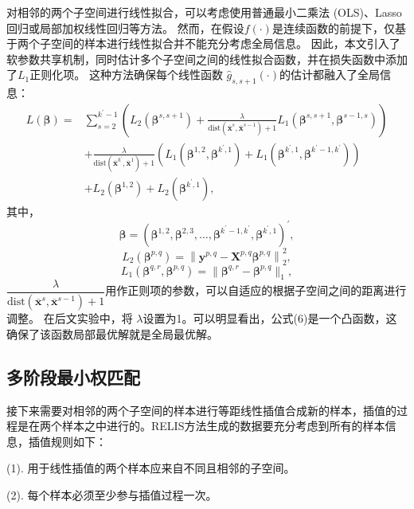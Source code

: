 \documentclass[12pt,a4paper]{article}%
\begin{document}
	对相邻的两个子空间进行线性拟合，可以考虑使用普通最小二乘法 (OLS)、Lasso 回归或局部加权线性回归等方法\cite{bib19,bib20,bib21}。 然而，在假设$f(\cdot) $是连续函数的前提下，仅基于两个子空间的样本进行线性拟合并不能充分考虑全局信息。
	因此，本文引入了软参数共享机制\cite{bib22,bib23,bib24}，同时估计多个子空间之间的线性拟合函数，并在损失函数中添加了$L_1$正则化项。 这种方法确保每个线性函数 $\hat{g}_{s,s+1}(\cdot)$的估计都融入了全局信息：
	\begin{equation} \label{equ8}
		\begin{aligned}
			L(\boldsymbol{\beta}) = & \sum\limits_{s=2}^{k^\prime-1}\left(L_2(\boldsymbol{\beta}^{s,s+1}) + \frac{\lambda}{\text{dist}(\overline{\boldsymbol{x}}^{s}, \overline{\boldsymbol{x}}^{s-1}) + 1}L_1(\boldsymbol{\beta}^{s,s+1}, \boldsymbol{\beta}^{s-1,s}) \right) \\
			&+ \frac{\lambda}{\text{dist}(\overline{\boldsymbol{x}}^{k^\prime}, \overline{\boldsymbol{x}}^{1}) + 1}(L_1(\boldsymbol{\beta}^{1,2}, \boldsymbol{\beta}^{k^\prime,1})+L_1(\boldsymbol{\beta}^{k^\prime,1},
			\boldsymbol{\beta}^{k^\prime-1,k^\prime}))\\
			& + L_2(\boldsymbol{\beta}^{1,2}) + L_2(\boldsymbol{\beta}^{k^\prime,1}),
		\end{aligned}
	\end{equation}
	其中，
	$$\boldsymbol{\beta}=\left(\boldsymbol{\beta}^{1,2},\boldsymbol{\beta}^{2,3},\ldots,\boldsymbol{\beta}^{k^\prime-1,k^\prime},\boldsymbol{\beta}^{k^\prime,1}\right)^\prime,$$ 
	$$L_2(\boldsymbol{\beta}^{p,q})=\left\|\boldsymbol{y}^{p, q}-\boldsymbol{X}^{p, q} \boldsymbol{\beta}^{p, q}\right\|_{2}^{2},$$ 
	$$L_1(\boldsymbol{\beta}^{q,r},\boldsymbol{\beta}^{p,q})=\|\boldsymbol{\beta}^{q,r}-\boldsymbol{\beta}^{p,q}\|_1,$$ 
	$\dfrac{\lambda}{\text{dist}(\overline{\boldsymbol{x}}^{s},\overline{\boldsymbol{x}}^{s-1})+1}$用作正则项的参数，可以自适应的根据子空间之间的距离进行调整。 在后文实验中，将 $\lambda$设置为1。可以明显看出，公式(6)是一个凸函数，这确保了该函数局部最优解就是全局最优解。
	\subsection{多阶段最小权匹配}
	
	接下来需要对相邻的两个子空间的样本进行等距线性插值合成新的样本，插值的过程是在两个样本之中进行的。RELIS方法生成的数据要充分考虑到所有的样本信息，插值规则如下：
	
	(1). 用于线性插值的两个样本应来自不同且相邻的子空间。

	(2). 每个样本必须至少参与插值过程一次。
\end{document}

